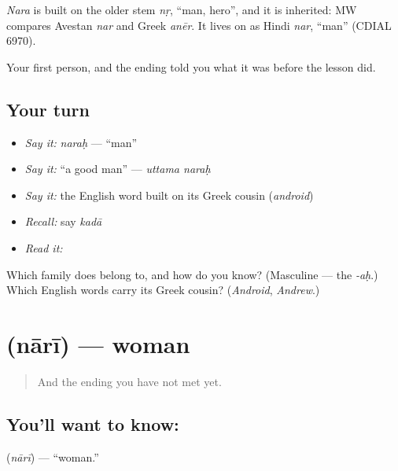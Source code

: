 \begin{cousinweb}
\emph{Nara} is built on the older stem \emph{nṛ}, \textquotedblleft{}man, hero\textquotedblright{}, and it is inherited: MW compares Avestan \emph{nar} and Greek \emph{anēr}. It lives on as Hindi \emph{nar}, \textquotedblleft{}man\textquotedblright{} (CDIAL 6970).
\end{cousinweb}

\begin{grammarlens}[title={What you've built}]
Your first person, and the ending told you what it was before the lesson did.
\end{grammarlens}

\subsection*{Your turn}
\begin{itemize}
\raggedright
  \item \emph{Say it:} \emph{naraḥ} — \textquotedblleft{}man\textquotedblright{}
  \item \emph{Say it:} \textquotedblleft{}a good man\textquotedblright{} — \emph{uttama naraḥ}
  \item \emph{Say it:} the English word built on its Greek cousin (\emph{android})
  \item \emph{Recall:} say \emph{kadā}
  \item \emph{Read it:} \textbf{}
\end{itemize}

\begin{tcolorbox}[breakable,colback=teal!4,colframe=teal!35!black,title={Before you move on}]
Which family does  belong to, and how do you know? (Masculine — the \emph{-aḥ}.) Which English words carry its Greek cousin? (\emph{Android}, \emph{Andrew}.)
\end{tcolorbox}
\section[\texorpdfstring{\sk{नारी} (nārī)}{नारी (nārī)}]{ (nārī) — woman}

\label{lesson:SA-C20-woman}



\begin{quote}
And the ending you have not met yet.
\end{quote}

\subsection*{You'll want to know: }
\textbf{} (\emph{nārī}) — \textquotedblleft{}woman.\textquotedblright{}

